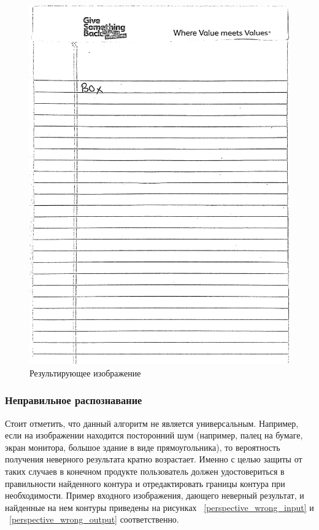 \begin{figure}
    \includegraphics[scale=0.05]{img/perspective/output.JPG}
    \caption{Результирующее изображение}
    \label{preprocess_out}
\end{figure}

\subsubsection{Неправильное распознавание}
Стоит отметить, что данный алгоритм не является универсальным. Например, если на изображении находится посторонний шум (например, палец на бумаге, экран монитора, большое здание в виде прямоугольника), 
то вероятность получения неверного результата кратно возрастает. Именно с целью защиты от таких случаев в конечном продукте пользователь должен удостовериться в правильности найденного контура и отредактировать границы контура при необходимости.
Пример входного изображения, дающего неверный результат, и найденные на нем контуры приведены на рисунках ~\ref{perspective_wrong_input} и ~\ref{perspective_wrong_output} соответственно.

